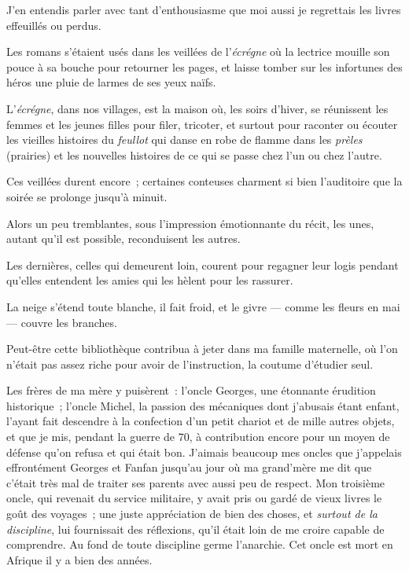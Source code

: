\documentclass[french,twoside]{book} %
\begin{document}
J’en entendis parler avec tant d’enthousiasme que moi aussi je regrettais les livres effeuillés ou perdus.\par
Les romans s’étaient usés dans les veillées de l’\emph{écrégne} où la lectrice mouille son pouce à sa bouche pour retourner les pages, et laisse tomber sur les infortunes des héros une pluie de larmes de ses yeux naïfs.\par
L’\emph{écrégne}, dans nos villages, est la maison où, les soirs d’hiver, se réunissent les femmes et les jeunes filles pour filer, tricoter, et surtout pour raconter ou écouter les vieilles histoires du \emph{feullot} qui danse en robe de flamme dans les \emph{prèles} (prairies) et les nouvelles histoires de ce qui se passe chez l’un ou chez l’autre.\par
Ces veillées durent encore ; certaines conteuses charment si bien l’auditoire que la soirée se prolonge jusqu’à minuit.\par
Alors un peu tremblantes, sous l’impression émotionnante du récit, les unes, autant qu’il est possible, reconduisent les autres.\par
Les dernières, celles qui demeurent loin, courent pour regagner leur logis pendant qu’elles  entendent les amies qui les hèlent pour les rassurer.\par
La neige s’étend toute blanche, il fait froid, et le givre — comme les fleurs en mai — couvre les branches.\par
Peut-être cette bibliothèque contribua à jeter dans ma famille maternelle, où l’on n’était pas assez riche pour avoir de l’instruction, la coutume d’étudier seul.\par
Les frères de ma mère y puisèrent : l’oncle Georges, une étonnante érudition historique ; l’oncle Michel, la passion des mécaniques dont j’abusais étant enfant, l’ayant fait descendre à la confection d’un petit chariot et de mille autres objets, et que je mis, pendant la guerre de 70, à contribution encore pour un moyen de défense qu’on refusa et qui était bon. J’aimais beaucoup mes oncles que j’appelais effrontément Georges et Fanfan jusqu’au jour où ma grand’mère me dit que c’était très mal de traiter ses parents avec aussi peu de respect. Mon troisième oncle, qui revenait du service militaire, y avait pris ou gardé de vieux livres le goût des voyages ; une juste appréciation de bien des choses, et \emph{surtout de la discipline}, lui fournissait des réflexions, qu’il était loin de me croire capable de comprendre. Au fond de toute discipline germe l’anarchie.  Cet oncle est mort en Afrique il y a bien des années.\par
\end{document}
